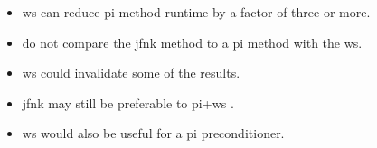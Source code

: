 \begin{frame}{}
  \begin{itemize}
    \item \gls{ws} can reduce \gls{pi} method runtime by a factor of three or
      more.
    \item \citeauthor{qe2paper} do not compare the \gls{jfnk} method to a
      \gls{pi} method with the \gls{ws}.
    \item \gls{ws} could invalidate some of the results.
    \item \gls{jfnk} may still be preferable to \gls{pi}+\gls{ws} \cite{jfnk_wielandt}.
    \item \gls{ws} would also be useful for a \gls{pi} preconditioner.
  \end{itemize}
\end{frame}
